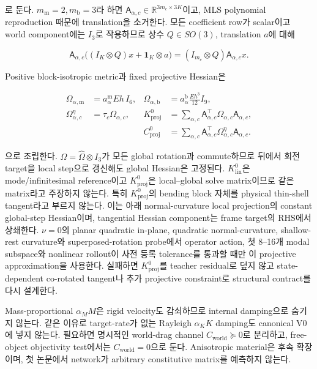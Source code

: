 \documentclass[11pt,a4paper]{article}
\newcommand{\R}{\mathbb{R}}
\begin{document}
로 둔다. \(m_{\mathrm m}=2,m_{\mathrm b}=3\)라 하면
\(\mathsf A_{\alpha,c}\in\R^{3m_c\times3K}\)이고,
MLS polynomial reproduction 때문에 translation을 소거한다.
모든 coefficient row가 scalar이고 world component에는 \(I_3\)로 작용하므로
상수 \(Q\in SO(3)\), translation \(a\)에 대해

\begin{equation}
  \mathsf A_{\alpha,c}
  \bigl((I_K\otimes Q)x+\mathbf1_K\otimes a\bigr)
  =(I_{m_c}\otimes Q)\mathsf A_{\alpha,c}x.
  \label{eq:vector-constraint-equivariance}
\end{equation}

Positive block-isotropic metric과 fixed projective Hessian은

\begin{equation}
\begin{aligned}
  \Omega_{\alpha,\mathrm m}
  &=a_\alpha^{\mathrm m}Eh\,I_6,
  &\Omega_{\alpha,\mathrm b}
  &=a_\alpha^{\mathrm b}\frac{Eh^3}{12}I_9,\\
  \Omega_{\alpha,c}^{\eta}
  &=\tau_c\Omega_{\alpha,c},
  &K_{\mathrm{proj}}^0
  &=\sum_{\alpha,c}\mathsf A_{\alpha,c}^\top
    \Omega_{\alpha,c}\mathsf A_{\alpha,c},\\
  &&C_{\mathrm{proj}}^0
  &=\sum_{\alpha,c}\mathsf A_{\alpha,c}^\top
    \Omega_{\alpha,c}^{\eta}\mathsf A_{\alpha,c}.
  \label{eq:fixed-vector-projective-hessian}
\end{aligned}
\end{equation}

으로 조립한다. \(\Omega=\widehat\Omega\otimes I_3\)가 모든 global rotation과 commute하므로
뒤에서 회전 target을 local step으로 갱신해도 global Hessian은 고정된다.
\(K_{\mathrm{lin}}^0\)은 mode/infinitesimal reference이고
\(K_{\mathrm{proj}}^0\)은 local--global solve matrix이므로 같은 matrix라고 주장하지 않는다.
특히 \(K_{\mathrm{proj}}^0\)의 bending block 자체를 physical thin-shell tangent라고 부르지 않는다.
이는 아래 normal-curvature local projection의 constant global-step Hessian이며,
tangential Hessian component는 frame target의 RHS에서 상쇄한다.
\(\nu=0\)의 planar quadratic in-plane, quadratic normal-curvature,
shallow-rest curvature와 superposed-rotation probe에서 operator action, 첫 8--16개 modal subspace와
nonlinear rollout이 사전 등록 tolerance를 통과할 때만 이 projective approximation을 사용한다.
실패하면 \(K_{\mathrm{proj}}^0\)를 teacher residual로 덮지 않고 state-dependent co-rotated tangent나
추가 projective constraint로 structural contract를 다시 설계한다.

Mass-proportional \(\alpha_MM\)은 rigid velocity도 감쇠하므로 internal damping으로 숨기지 않는다.
같은 이유로 target-rate가 없는 Rayleigh \(\alpha_KK\) damping도 canonical V0에 넣지 않는다.
필요하면 명시적인 world-drag channel \(C_{\mathrm{world}}\succeq0\)로 분리하고,
free-object objectivity test에서는 \(C_{\mathrm{world}}=0\)으로 둔다.
Anisotropic material은 후속 확장이며, 첫 논문에서 network가 arbitrary constitutive matrix를 예측하지 않는다.
\end{document}
